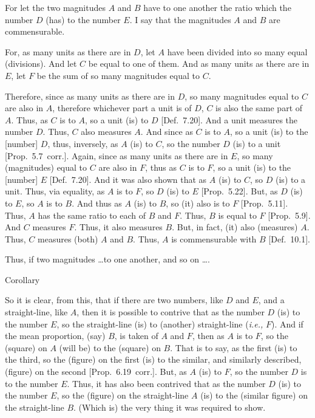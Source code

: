 \epsfysize=0.8in
\centerline{}

For let the two magnitudes $A$ and $B$ have to one another the ratio which
the number $D$ (has) to the number $E$. I say that the magnitudes $A$ and $B$ are commensurable.

For, as many units as there are in $D$, let $A$ have been divided into so many
equal (divisions). And let $C$ be equal to one of them. And as many
units as there are in $E$, let $F$ be the sum  of so many magnitudes equal to
$C$.

Therefore, since as many units as there are in $D$, so many magnitudes equal to $C$ are also in $A$, therefore whichever part a unit is of $D$, $C$ is also
the same part of $A$. Thus, as $C$ is to $A$, so a unit (is) to $D$ [Def.~7.20]. And a unit measures the number $D$.
Thus, $C$ also measures $A$. And since as $C$ is to $A$, so a unit (is) to
the [number] $D$, thus, inversely, as $A$ (is) to $C$, so the number $D$
(is) to a unit [Prop.~5.7~corr.]. Again, since as many 
units as there are in $E$,  so many (magnitudes) equal to $C$ are also in $F$,
thus as $C$ is to $F$, so a unit (is) to the [number] $E$ [Def.~7.20]. And it was also shown that as $A$ (is) to $C$, so $D$ (is) to a unit. Thus, via equality, as $A$ is to $F$, so $D$ (is)
to $E$ [Prop.~5.22]. But, as $D$ (is) to $E$, 
so $A$ is to $B$. And thus as $A$ (is) to $B$, so (it) also is to $F$ [Prop.~5.11]. Thus,
$A$ has the same ratio to each of $B$ and $F$. Thus, $B$ is equal to
$F$ [Prop.~5.9]. And $C$ measures $F$. Thus,
it also measures $B$. But, in fact, (it) also (measures) $A$. Thus, $C$ measures (both) $A$ and $B$. Thus, $A$ is commensurable with $B$ [Def.~10.1].

Thus,  if two magnitudes \ldots to one another, and so on \ldots.\\

\begin{center}
{\large Corollary}
\end{center}\vspace*{-7pt}

So it is clear, from this, that if there are two numbers, like $D$ and $E$, and
a straight-line, like $A$, then it is possible to contrive that as the number $D$ (is)
to the number $E$, so the straight-line (is) to (another) straight-line ({\em i.e.,} $F$). And if the mean proportion, (say) $B$,  is taken of $A$ and $F$, 
then as $A$ is to $F$, so the (square) on $A$ (will be) to the (square)
on $B$. That is to say, as the first (is) to the third, so the
(figure) on the first (is) to the similar, and similarly described, (figure) on the second [Prop.~6.19~corr.]. But, as $A$ (is) to
$F$, so the number $D$ is to the number $E$. Thus, it has also been contrived
that as the number $D$ (is) to the number $E$, so the (figure) on the
straight-line $A$ (is) to the (similar figure) on the straight-line $B$. (Which is)
the very thing it was required to show.

